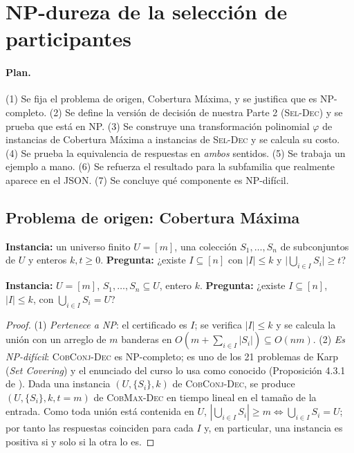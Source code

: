 \section{NP-dureza de la selección de participantes}\label{sec:np}

\paragraph{Plan.} (1) Se fija el problema de origen, Cobertura Máxima, y se justifica que es NP-completo. (2) Se define la versión de decisión de nuestra Parte 2 (\textsc{Sel-Dec}) y se prueba que está en NP. (3) Se construye una transformación polinomial $\varphi$ de instancias de Cobertura Máxima a instancias de \textsc{Sel-Dec} y se calcula su costo. (4) Se prueba la equivalencia de respuestas en \emph{ambos} sentidos. (5) Se trabaja un ejemplo a mano. (6) Se refuerza el resultado para la subfamilia que realmente aparece en el JSON. (7) Se concluye qué componente es NP-difícil.

\subsection{Problema de origen: Cobertura Máxima}

\begin{definicion}
\textbf{Instancia:} un universo finito $U=[m]$, una colección $S_1,\dots,S_n$ de subconjuntos de $U$ y enteros $k,t\ge 0$. \textbf{Pregunta:} ¿existe $I\subseteq[n]$ con $|I|\le k$ y $\bigl|\bigcup_{i\in I}S_i\bigr|\ge t$?
\end{definicion}

\begin{definicion}
\textbf{Instancia:} $U=[m]$, $S_1,\dots,S_n\subseteq U$, entero $k$. \textbf{Pregunta:} ¿existe $I\subseteq[n]$, $|I|\le k$, con $\bigcup_{i\in I}S_i=U$?
\end{definicion}

\begin{lema}\label{lem:cobmax}
\end{lema}
\begin{proof}
(1) \emph{Pertenece a NP}: el certificado es $I$; se verifica $|I|\le k$ y se calcula la unión con un arreglo de $m$ banderas en $O(m+\sum_{i\in I}|S_i|)\subseteq O(nm)$.
(2) \emph{Es NP-difícil}: \textsc{CobConj-Dec} es NP-completo; es uno de los 21 problemas de Karp \cite{karp1972} (\emph{Set Covering}) y el enunciado del curso lo usa como conocido (Proposición 4.3.1 de \cite{enunciado}). Dada una instancia $(U,\{S_i\},k)$ de \textsc{CobConj-Dec}, se produce $(U,\{S_i\},k,t=m)$ de \textsc{CobMax-Dec} en tiempo lineal en el tamaño de la entrada. Como toda unión está contenida en $U$, $|\bigcup_{i\in I}S_i|\ge m \iff \bigcup_{i\in I}S_i=U$; por tanto las respuestas coinciden para cada $I$ y, en particular, una instancia es positiva si y solo si la otra lo es.
\end{proof}

